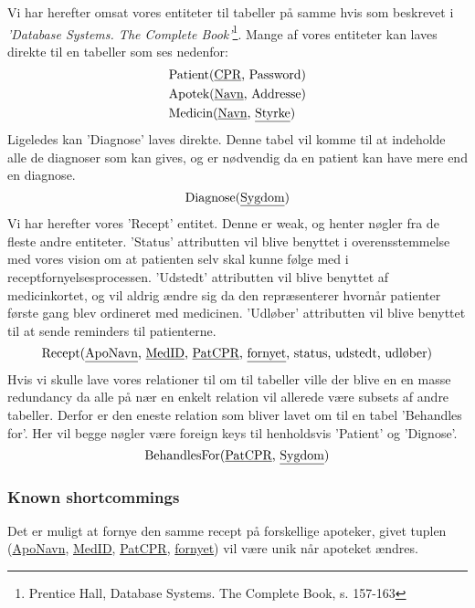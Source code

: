 Vi har herefter omsat vores entiteter til tabeller på samme hvis som beskrevet i \textit{'Database Systems. The Complete Book'}\footnote{Prentice Hall, Database Systems. The Complete Book, s. 157-163}. Mange af vores entiteter kan laves direkte til en tabeller som ses nedenfor:
\begin{align*}
	&\textrm{Patient}(\textrm{\underline{CPR}, Password})\\
	&\textrm{Apotek}(\textrm{\underline{Navn}, Addresse})\\
	&\textrm{Medicin}(\textrm{\underline{Navn}, \underline{Styrke}})\\
\end{align*}
Ligeledes kan 'Diagnose' laves direkte. Denne tabel vil komme til at indeholde alle de diagnoser som kan gives, og er nødvendig da en patient kan have mere end en diagnose.
\begin{equation*}
\textrm{Diagnose}(\textrm{\underline{Sygdom}})
\end{equation*}
Vi har herefter vores 'Recept' entitet. Denne er weak, og henter nøgler fra de fleste andre entiteter. 'Status' attributten vil blive benyttet i overensstemmelse med vores vision om at patienten selv skal kunne følge med i receptfornyelsesprocessen. 'Udstedt' attributten vil blive benyttet af medicinkortet, og vil aldrig ændre sig da den repræsenterer hvornår patienter første gang blev ordineret med medicinen. 'Udløber' attributten vil blive benyttet til at sende reminders til patienterne. 
\begin{equation*}
	\textrm{Recept}(\textrm{\underline{ApoNavn}, \underline{MedID}, \underline{PatCPR}, \underline{fornyet}, status, udstedt, udløber})
\end{equation*}
Hvis vi skulle lave vores relationer til om til tabeller ville der blive en en masse redundancy da alle på nær en enkelt relation vil allerede være subsets af andre tabeller. Derfor er den eneste relation som bliver lavet om til en tabel 'Behandles for'. Her vil begge nøgler være foreign keys til henholdsvis 'Patient' og 'Dignose'.
\begin{equation*}
\textrm{BehandlesFor}(\textrm{\underline{PatCPR}, \underline{Sygdom}})
\end{equation*}

\subsubsection{Known shortcommings}
Det er muligt at fornye den samme recept på forskellige apoteker, givet tuplen (\underline{ApoNavn}, \underline{MedID}, \underline{PatCPR}, \underline{fornyet}) vil være unik når apoteket ændres.